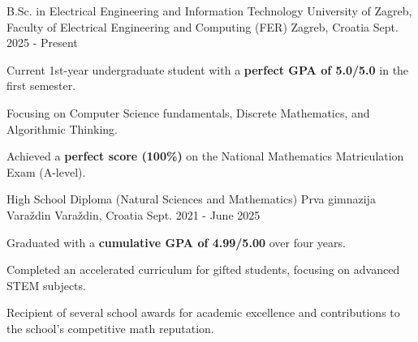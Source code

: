 

\begin{cventries}


  \cventry
    {B.Sc. in Electrical Engineering and Information Technology} %
    {University of Zagreb, Faculty of Electrical Engineering and Computing (FER)} %
    {Zagreb, Croatia} %
    {Sept. 2025 - Present} %
    {
      \begin{cvitems} %
        \item {Current 1st-year undergraduate student with a \textbf{perfect GPA of 5.0/5.0} in the first semester.}
        \item {Focusing on Computer Science fundamentals, Discrete Mathematics, and Algorithmic Thinking.}
        \item {Achieved a \textbf{perfect score (100\%)} on the National Mathematics Matriculation Exam (A-level).}
      \end{cvitems}
      \vspace{4mm}
    }

  \cventry
    {High School Diploma (Natural Sciences and Mathematics)} %
    {Prva gimnazija Varaždin} %
    {Varaždin, Croatia} %
    {Sept. 2021 - June 2025} %
    {
      \begin{cvitems} %
        \item {Graduated with a \textbf{cumulative GPA of 4.99/5.00} over four years.}
        \item {Completed an accelerated curriculum for gifted students, focusing on advanced STEM subjects.}
        \item {Recipient of several school awards for academic excellence and contributions to the school's competitive math reputation.}
      \end{cvitems}
    }

\end{cventries}

